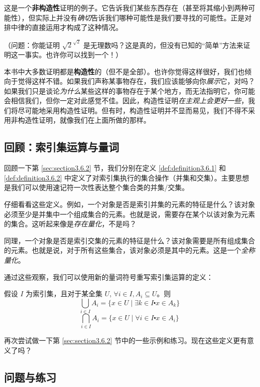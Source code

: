 这是一个\textbf{非构造性}证明的例子。它告诉我们某些东西存在（甚至将其缩小到两种可能性），但实际上并没有\emph{确切}告诉我们哪种可能性是我们要寻找的可能性。正是对排中律的直接运用才构成了这种情况。

（问题：你能证明 $\sqrt{2}^{\sqrt{2}}$ 是无理数吗？这是真的，但没有已知的``简单''方法来证明这一事实。也许你可以找到一个！）

本书中大多数证明都是\textbf{构造性}的（但不是全部）。也许你觉得这样很好，我们也倾向于觉得这样不错。如果我们声称某事物存在，我们应该能够向你\emph{展示}它，对吗？如果我们只是谈论\emph{为什么}某些这样的事物存在于某个地方，而无法指明它，你可能会相信我们，但你一定对此感觉不佳。因此，构造性证明\emph{在主观上会更好一些}，我们将尽可能地采用构造性证明。但有时，构造性证明并不显而易见，我们不得不采用非构造性证明，就像我们在上面所做的那样。

\subsection{回顾：索引集运算与量词}

回顾一下第 \ref{sec:section3.6.2} 节，我们分别在定义 \ref{def:definition3.6.1} 和 \ref{def:definition3.6.2} 中定义了对索引集执行的集合操作（并集和交集）。主要思想是我们可以使用速记符一次性表达整个集合类的并集/交集。

仔细看看这些定义。例如，一个对象是否是索引并集的元素的特征是什么？该对象必须至少是并集中一个组成集合的元素。也就是说，需要存在某个以该对象为元素的集合。这听起来像是\emph{存在量化}，不是吗？

同理，一个对象是否是索引交集的元素的特征是什么？该对象需要是所有组成集合的元素。也就是说，对于所有这些集合，该对象必须是其中的元素。这是一个\emph{全称量化}。

通过这些观察，我们可以使用新的量词符号重写索引集运算的定义：

\clearpage 

\begin{definition}
    假设 $I$ 为索引集，且对于某全集 $U$, $\forall i \in I, A_i \subseteq U$。则
    \[\bigcup_{i \in I} A_i = \{x \in U \mid \exists k \in I \centerdot x \in A_k\}\]
    \[\bigcap_{i \in I} A_i = \{x \in U \mid \forall i \in I \centerdot x \in A_i\}\]
\end{definition}

再次尝试做一下第 \ref{sec:section3.6.2} 节中的一些示例和练习。现在这些定义更有意义了吗？

\subsection{问题与练习}

